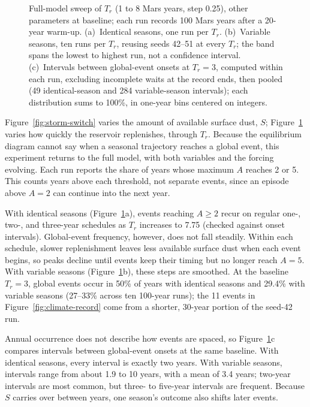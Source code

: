 \begin{figure}
  \centering
  \caption{Full-model sweep of $T_r$ (1 to 8 Mars years, step 0.25), other parameters at baseline; each run records 100 Mars years after a 20-year warm-up. (a)~Identical seasons, one run per $T_r$. (b)~Variable seasons, ten runs per $T_r$, reusing seeds 42--51 at every $T_r$; the band spans the lowest to highest run, not a confidence interval. (c)~Intervals between global-event onsets at $T_r = 3$, computed within each run, excluding incomplete waits at the record ends, then pooled (49 identical-season and 284 variable-season intervals); each distribution sums to 100\%, in one-year bins centered on integers.}
  \label{fig:recharge-sweep}
\end{figure}
Figure~\ref{fig:storm-switch} varies the amount of available surface dust, $S$; Figure~\ref{fig:recharge-sweep} varies how quickly the reservoir replenishes, through $T_r$. Because the equilibrium diagram cannot say when a seasonal trajectory reaches a global event, this experiment returns to the full model, with both variables and the forcing evolving. Each run reports the share of years whose maximum $A$ reaches 2 or 5. This counts years above each threshold, not separate events, since an episode above $A = 2$ can continue into the next year.

With identical seasons (Figure~\ref{fig:recharge-sweep}a), events reaching $A \ge 2$ recur on regular one-, two-, and three-year schedules as $T_r$ increases to 7.75 (checked against onset intervals). Global-event frequency, however, does not fall steadily. Within each schedule, slower replenishment leaves less available surface dust when each event begins, so peaks decline until events keep their timing but no longer reach $A = 5$. With variable seasons (Figure~\ref{fig:recharge-sweep}b), these steps are smoothed. At the baseline $T_r = 3$, global events occur in 50\% of years with identical seasons and 29.4\% with variable seasons (27--33\% across ten 100-year runs); the 11 events in Figure~\ref{fig:climate-record} come from a shorter, 30-year portion of the seed-42 run.

Annual occurrence does not describe how events are spaced, so Figure~\ref{fig:recharge-sweep}c compares intervals between global-event onsets at the same baseline. With identical seasons, every interval is exactly two years. With variable seasons, intervals range from about 1.9 to 10 years, with a mean of 3.4 years; two-year intervals are most common, but three- to five-year intervals are frequent. Because $S$ carries over between years, one season's outcome also shifts later events.
